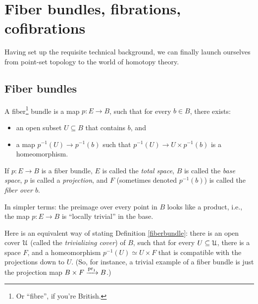 \section{Fiber bundles, fibrations, cofibrations}
Having set up the requisite technical background, 
we can finally launch ourselves from point-set topology to the world of homotopy theory.
\subsection{Fiber bundles}
\begin{definition}\label{fiberbundle}
    A fiber\footnote{Or ``fibre'', if you're British.} bundle is a map $p:E\to B$,
    such that for every $b\in B$, there exists:
    \begin{itemize}
	\item an open subset $U\subseteq B$ that contains $b$, and
	\item a map $p^{-1}(U)\to p^{-1}(b)$ such that $p^{-1}(U)\to U\times p^{-1}(b)$ is a homeomorphism.
    \end{itemize}
    If $p:E\to B$ is a fiber bundle, $E$ is called the \emph{total space}, $B$ is called the
    \emph{base space}, $p$ is called a \emph{projection},
    and $F$ (sometimes denoted $p^{-1}(b)$) is called the \emph{fiber over $b$}.
\end{definition}
In simpler terms: the preimage over every point in $B$ looks like a product,
i.e., the map $p:E\to B$ is ``locally trivial'' in the base.

Here is an equivalent way of stating Definition \ref{fiberbundle}:
there is an open cover $\mathcal U$ (called the \emph{trivializing cover}) of $B$,
such that for every $U\subseteq \mathcal U$,
there is a space $F$, and a homeomorphism
$p^{-1}(U)\simeq U\times F$ that is compatible with the projections down to $U$.
(So, for instance, a trivial example of a fiber bundle is just the projection map $B\times F\xrightarrow{{\mathrm{pr}_1}} B$.)


